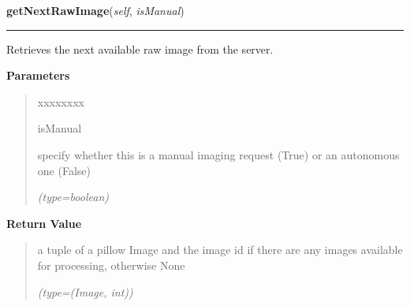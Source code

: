 \hspace{.8\funcindent}\begin{boxedminipage}{\funcwidth}

    \raggedright \textbf{getNextRawImage}(\textit{self}, \textit{isManual})

    \vspace{-1.5ex}

    \rule{\textwidth}{0.5\fboxrule}
\setlength{\parskip}{2ex}
    Retrieves the next available raw image from the server.

\setlength{\parskip}{1ex}
      \textbf{Parameters}
      \vspace{-1ex}

      \begin{quote}
        \begin{Ventry}{xxxxxxxx}

          \item[isManual]

          specify whether this is a manual imaging request (True) or an 
          autonomous one (False)

            {\it (type=boolean)}

        \end{Ventry}

      \end{quote}

      \textbf{Return Value}
    \vspace{-1ex}

      \begin{quote}
      a tuple of a pillow Image and the image id if there are any images 
      available for processing, otherwise None

      {\it (type=(Image, int))}

      \end{quote}

    \end{boxedminipage}

    \label{client_rest:ImagingInterface:getPrevRawImage}

    \vspace{0.5ex}

